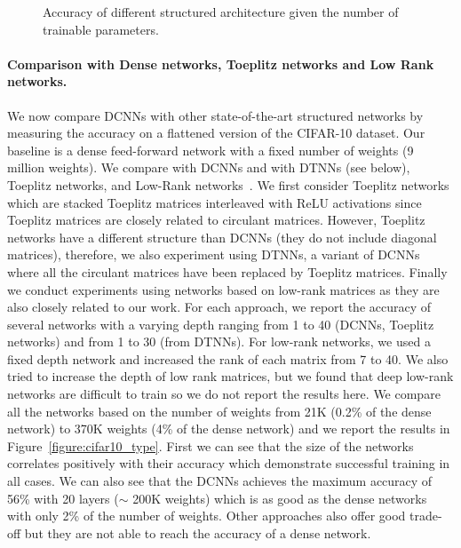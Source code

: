\begin{figure}
   \centering
   
   \caption{Accuracy of different structured architecture given the number of trainable parameters.}
   \label{figure:cifar10_with_channels_xp}
\end{figure}


\paragraph{Comparison with Dense networks, Toeplitz networks and Low Rank networks.}
We now compare DCNNs with other state-of-the-art structured networks by measuring the accuracy on a flattened version of the CIFAR-10 dataset.
Our baseline is a dense feed-forward network with a fixed number of weights (9 million weights).
We compare with DCNNs and with DTNNs (see below), Toeplitz networks, and Low-Rank networks~\cite{8099498}.
We first consider Toeplitz networks which are stacked Toeplitz matrices interleaved with ReLU activations since Toeplitz matrices are closely related to circulant matrices.
However, Toeplitz networks have a different structure than DCNNs (they do not include diagonal matrices), therefore, we also experiment using DTNNs, a variant of DCNNs where all the circulant matrices have been replaced by Toeplitz matrices.
Finally we conduct experiments using networks based on low-rank matrices as they are also closely related to our work.
For each approach, we report the accuracy of several networks with a varying depth ranging from 1 to 40 (DCNNs, Toeplitz networks) and from 1 to 30 (from DTNNs).
For low-rank networks, we used a fixed depth network and increased the rank of each matrix from 7 to 40.
We also tried to increase the depth of low rank matrices, but we found that deep low-rank networks are difficult to train so we do not report the results here.
We compare all the networks based on the number of weights from 21K (0.2\% of the dense network) to 370K weights (4\% of the dense network) and we report the results in Figure~\ref{figure:cifar10_type}. 
First we can see that the size of the networks correlates positively with their accuracy which demonstrate successful training in all cases.
We can also see that the DCNNs achieves the maximum accuracy of 56\% with 20 layers ($\sim$ 200K weights) which is as good as the dense networks with only 2\% of the number of weights.
Other approaches also offer good trade-off but they are not able to reach the accuracy of a dense network.


